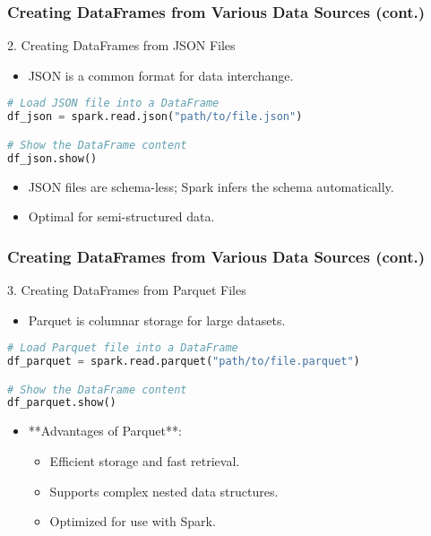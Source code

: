 \documentclass[aspectratio=169]{beamer}
\begin{document}
\begin{frame}
    \frametitle{Creating DataFrames from Various Data Sources (cont.)}
    \begin{block}{2. Creating DataFrames from JSON Files}
        \begin{itemize}
            \item JSON is a common format for data interchange.
        \end{itemize}
        \begin{lstlisting}[language=python]
# Load JSON file into a DataFrame
df_json = spark.read.json("path/to/file.json")

# Show the DataFrame content
df_json.show()
        \end{lstlisting}
        \begin{itemize}
            \item JSON files are schema-less; Spark infers the schema automatically.
            \item Optimal for semi-structured data.
        \end{itemize}
    \end{block}
\end{frame}

\begin{frame}
    \frametitle{Creating DataFrames from Various Data Sources (cont.)}
    \begin{block}{3. Creating DataFrames from Parquet Files}
        \begin{itemize}
            \item Parquet is columnar storage for large datasets.
        \end{itemize}
        \begin{lstlisting}[language=python]
# Load Parquet file into a DataFrame
df_parquet = spark.read.parquet("path/to/file.parquet")

# Show the DataFrame content
df_parquet.show()
        \end{lstlisting}
        \begin{itemize}
            \item **Advantages of Parquet**:
                \begin{itemize}
                    \item Efficient storage and fast retrieval.
                    \item Supports complex nested data structures.
                    \item Optimized for use with Spark.
                \end{itemize}
        \end{itemize}
    \end{block}
\end{frame}
\end{document}
